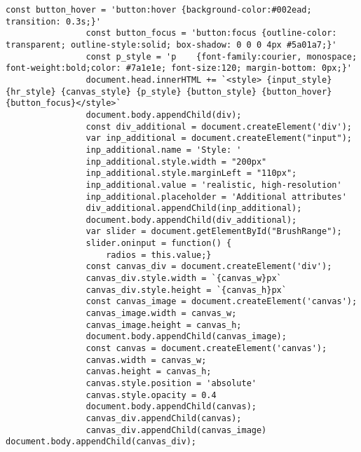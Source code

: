 \begin{lstlisting}[basicstyle=\ttfamily\small]
                const button_hover = 'button:hover {background-color:#002ead; transition: 0.3s;}'
                const button_focus = 'button:focus {outline-color: transparent; outline-style:solid; box-shadow: 0 0 0 4px #5a01a7;}'
                const p_style = 'p    {font-family:courier, monospace; font-weight:bold;color: #7a1e1e; font-size:120; margin-bottom: 0px;}'
                document.head.innerHTML += `<style> {input_style} {hr_style} {canvas_style} {p_style} {button_style} {button_hover} {button_focus}</style>`
                document.body.appendChild(div);
                const div_additional = document.createElement('div');
                var inp_additional = document.createElement("input");
                inp_additional.name = 'Style: '
                inp_additional.style.width = "200px"
                inp_additional.style.marginLeft = "110px";
                inp_additional.value = 'realistic, high-resolution'
                inp_additional.placeholder = 'Additional attributes'
                div_additional.appendChild(inp_additional);
                document.body.appendChild(div_additional);
                var slider = document.getElementById("BrushRange");
                slider.oninput = function() {
                    radios = this.value;}
                const canvas_div = document.createElement('div');
                canvas_div.style.width = `{canvas_w}px`
                canvas_div.style.height = `{canvas_h}px`
                const canvas_image = document.createElement('canvas');
                canvas_image.width = canvas_w;
                canvas_image.height = canvas_h;
                document.body.appendChild(canvas_image);
                const canvas = document.createElement('canvas');
                canvas.width = canvas_w;
                canvas.height = canvas_h;
                canvas.style.position = 'absolute'
                canvas.style.opacity = 0.4
                document.body.appendChild(canvas);
                canvas_div.appendChild(canvas);
                canvas_div.appendChild(canvas_image)          document.body.appendChild(canvas_div);
                \end{lstlisting}

